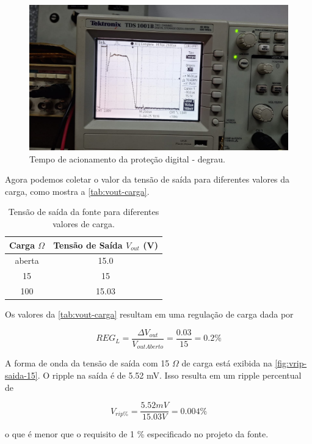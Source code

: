 \documentclass[
	12pt,				%
	oneside,			%
	a4paper,			%
	chapter=TITLE,
	sumario=tradicional,
	english,			%
	brazil				%
]{abntex2}
\begin{document}
\begin{figure}[H]
    \centering
    \includegraphics[width=0.9\linewidth]{images/resultados/tempo-prot-digital-curto.jpeg}
    \caption{Tempo de acionamento da proteção digital - degrau.}
    \label{fig:tempo-prot-digital-curto}
\end{figure}

Agora podemos coletar o valor da tensão de saída para diferentes valores da carga, 
como mostra a \autoref{tab:vout-carga}.

\begin{table}[htb]
	\caption{Tensão de saída da fonte para diferentes valores de carga.}
	\centering
	\begin{tabular}{c|c}
		\hline
    		\textbf{Carga} $\Omega$  & \textbf{Tensão de Saída} $V_{out}$ (V) \\
            \hline
    		aberta & 15.0  \\
            \hline
            15 & 15 \\
            \hline
            100 & 15.03
	\end{tabular}
	\label{tab:vout-carga}
\end{table}

Os valores da \autoref{tab:vout-carga} resultam em uma regulação de carga dada por 

\[ REG_L = \frac{\Delta V_{out}}{V_{outAberto}} = \frac{0.03}{15} = 0.2 \%  \]

A forma de onda da tensão de saída com 15 $\Omega$ de carga está exibida na 
\autoref{fig:vrip-saida-15}. O ripple na saída é de 5.52 mV. Isso resulta 
em um ripple percentual de 

\[ V_{rip \%} = \frac{5.52 mV}{15.03 V} = 0.004 \%  \]

\noindent o que é menor que o requisito de 1 \% especificado no projeto da fonte.
\end{document}
